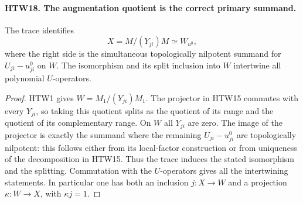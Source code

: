 \documentclass[11pt,a4paper]{article}
\numberwithin{equation}{section}
\theoremstyle{remark}\newtheorem{remark}[theorem]{Remark}
\begin{document}
\paragraph{HTW18. The augmentation quotient is the correct primary summand.}
\label{claim:HTW18}
The trace identifies
\[
 X=M/(Y_{ji})M
       \simeq W_{u^0},
 \tag{HTW.21}
\]
where the right side is the simultaneous topologically
nilpotent summand for \(U_{ji}-u^0_{ji}\) on \(W\).
The isomorphism and its split inclusion into \(W\)
intertwine all polynomial \(U\)-operators.
\begin{proof}
HTW1 gives \(W=M_1/(Y_{ji})M_1\).  The projector
in HTW15 commutes with every \(Y_{ji}\), so taking
this quotient splits as the quotient of its range
and the quotient of its complementary range.
On \(W\) all \(Y_{ji}\) are zero.  The image of the
projector is exactly the summand where the remaining
\(U_{ji}-u^0_{ji}\) are topologically nilpotent:
this follows either from its local-factor construction
or from uniqueness of the decomposition in HTW15.
Thus the trace induces the stated isomorphism and
the splitting.  Commutation with the \(U\)-operators
gives all the intertwining statements.  In particular
one has both an inclusion \(j:X\to W\) and a
projection \(\kappa:W\to X\), with \(\kappa j=1\).
\end{proof}

\end{document}
